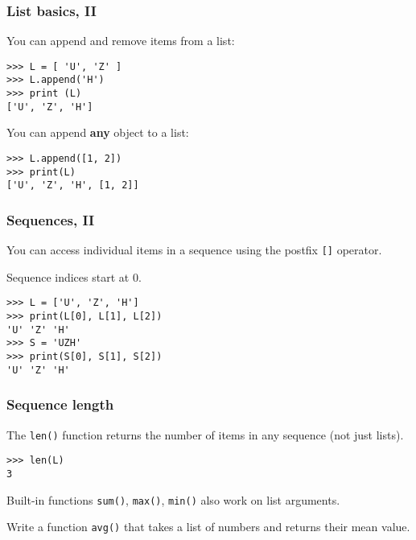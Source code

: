 \documentclass[english,serif,mathserif,xcolor=pdftex,dvipsnames,table]{beamer}
\begin{document}
\begin{frame}[fragile]
  \frametitle{List basics, II}

  You can append and remove items from a list:
\begin{lstlisting}
>>> L = [ 'U', 'Z' ]
>>> L.append('H')
>>> print (L)
['U', 'Z', 'H']
\end{lstlisting}

  \+\pause
  You can append \textbf{any} object to a list:
\begin{lstlisting}
>>> L.append([1, 2])
>>> print(L)
['U', 'Z', 'H', [1, 2]]
\end{lstlisting}

\end{frame}


\begin{frame}
  \frametitle{Sequences, II}
  You can access individual items in a sequence using the postfix
  \texttt{[]} operator.

  \+
  Sequence indices start at 0.

\begin{lstlisting}
>>> L = ['U', 'Z', 'H']
>>> print(L[0], L[1], L[2])
'U' 'Z' 'H'
>>> S = 'UZH'
>>> print(S[0], S[1], S[2])
'U' 'Z' 'H'
\end{lstlisting}
\end{frame}


\begin{frame}[fragile]
  \frametitle{Sequence length}
The \texttt{len()} function returns the number of items in any
  sequence (not just lists).
\begin{lstlisting}
>>> len(L)
3
\end{lstlisting}

  \+ Built-in functions \lstinline|sum()|, \lstinline|max()|, \lstinline|min()|
  also work on list arguments.
\end{frame}


\begin{frame}
  \begin{exercise*}[3.A]
    Write a function \texttt{avg()} that takes a list of numbers and returns
    their mean value.
  \end{exercise*}
\end{frame}
\end{document}
